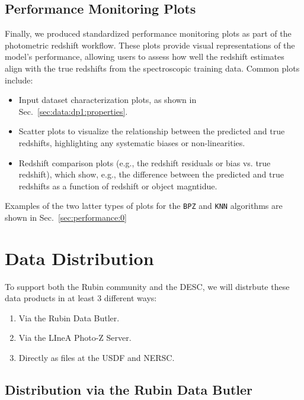 


\subsection{Performance Monitoring Plots}
\label{sec:products:peformance_plots}

Finally, we produced standardized performance monitoring plots as part of the photometric redshift workflow.  These plots provide visual representations of the model's performance, allowing users to assess how well the redshift estimates align with the true redshifts from the spectroscopic training data.  Common plots include:

\begin{itemize}
\item{Input dataset characterization plots, as shown in Sec.~\ref{sec:data:dp1:properties}.}
\item{Scatter plots to visualize the relationship between the predicted and true redshifts, highlighting any systematic biases or non-linearities.}
\item{Redshift comparison plots (e.g., the redshift residuals or bias vs.  true redshift), which show, e.g., the difference between the predicted and true redshifts as a function of redshift or object magntidue.}
\end{itemize}

Examples of the two latter types of plots for the \texttt{BPZ} and \texttt{KNN} algorithms are shown in Sec.~\ref{sec:performance:0}



\section{Data Distribution}
\label{sec:distribution:0}

To support both the Rubin community and the DESC, we will distrbute these data products in at least 3 different ways:
\begin{enumerate}
\item{Via the Rubin Data Butler.}
\item{Via the LIneA Photo-Z Server.}
\item{Directly as files at the USDF and NERSC.}
\end{enumerate}

\subsection{Distribution via the Rubin Data Butler}
\label{sec:distribution:butler}


